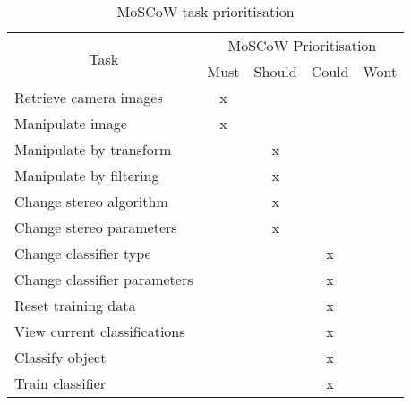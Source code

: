 \begin{table}[h]
\centering
\begin{tabular}{|l|c|c|c|c|}
\hline
\multicolumn{1}{|c|}{\multirow{2}{*}{Task}} & \multicolumn{4}{c|}{MoSCoW Prioritisation} \\ \cline{2-5} 
\multicolumn{1}{|c|}{}                      & Must     & Should     & Could    & Wont    \\ \hline
Retrieve camera images                      & x        &            &          &         \\ \cline{1-1}
Manipulate image                            & x        &            &          &         \\ \cline{1-1}
Manipulate by transform                     &          & x          &          &         \\ \cline{1-1}
Manipulate by filtering                     &          & x          &          &         \\ \cline{1-1}
Change stereo algorithm                     &          & x          &          &         \\ \cline{1-1}
Change stereo parameters                    &          & x          &          &         \\ \cline{1-1}
Change classifier type                      &          &            & x        &         \\ \cline{1-1}
Change classifier parameters                &          &            & x        &         \\ \cline{1-1}
Reset training data                         &          &            & x        &         \\ \cline{1-1}
View current classifications                &          &            & x        &         \\ \cline{1-1}
Classify object                             &          &            & x        &         \\ \cline{1-1}
Train classifier                            &          &            & x        &         \\ \hline
\end{tabular}
\caption{MoSCoW task prioritisation\protect {\label{tab:moscow_table}}}
\end{table}

